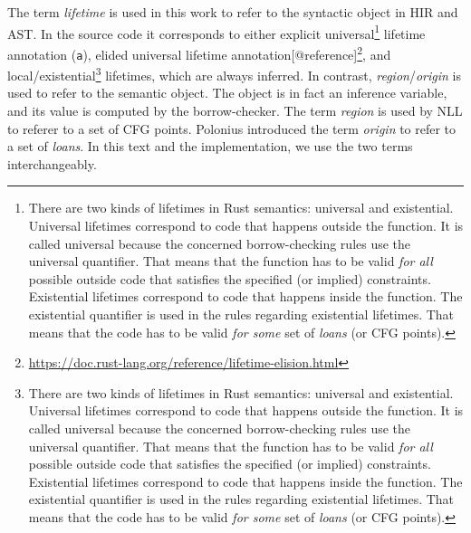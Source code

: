 \documentclass[
  11pt,
]{report}
\renewenvironment{quote}{\begin{myquote}}{\end{myquote}}
\DeclareRobustCommand{\href}[2]{#2\footnote{\url{#1}}}
\begin{document}
\begin{quote}
The term \emph{lifetime} is used in this work to refer to the syntactic
object in HIR and AST. In the source code it corresponds to either
explicit universal\footnote{There are two kinds of lifetimes in Rust
  semantics: universal and existential. Universal lifetimes correspond
  to code that happens outside the function. It is called universal
  because the concerned borrow-checking rules use the universal
  quantifier. That means that the function has to be valid \emph{for
  all} possible outside code that satisfies the specified (or implied)
  constraints. Existential lifetimes correspond to code that happens
  inside the function. The existential quantifier is used in the rules
  regarding existential lifetimes. That means that the code has to be
  valid \emph{for some} set of \emph{loans} (or CFG points).} lifetime
annotation (\texttt{\textquotesingle{}a}), elided universal lifetime
annotation\href{https://doc.rust-lang.org/reference/lifetime-elision.html}{{[}@reference{]}},
and local/existential\footnote{There are two kinds of lifetimes in Rust
  semantics: universal and existential. Universal lifetimes correspond
  to code that happens outside the function. It is called universal
  because the concerned borrow-checking rules use the universal
  quantifier. That means that the function has to be valid \emph{for
  all} possible outside code that satisfies the specified (or implied)
  constraints. Existential lifetimes correspond to code that happens
  inside the function. The existential quantifier is used in the rules
  regarding existential lifetimes. That means that the code has to be
  valid \emph{for some} set of \emph{loans} (or CFG points).} lifetimes,
which are always inferred. In contrast, \emph{region}/\emph{origin} is
used to refer to the semantic object. The object is in fact an inference
variable, and its value is computed by the borrow-checker. The term
\emph{region} is used by NLL to referer to a set of CFG points. Polonius
introduced the term \emph{origin} to refer to a set of \emph{loans}. In
this text and the implementation, we use the two terms interchangeably.
\end{quote}
\end{document}
